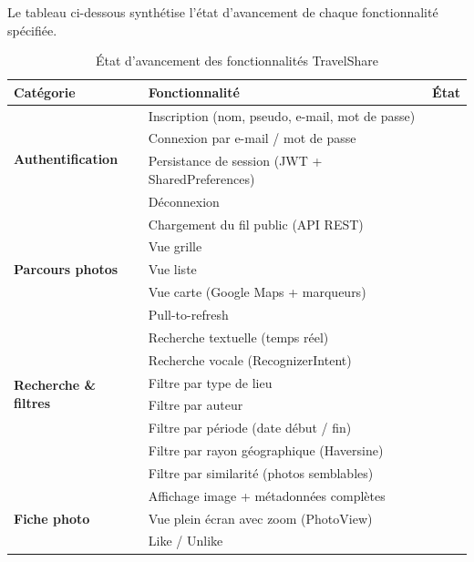 \documentclass[12pt, a4paper, openany]{report}
\newcommand{\cmark}{\textcolor{success}{\ding{51}}}
\newcommand{\pmark}{\textcolor{warning}{\ding{119}}}
\begin{document}
Le tableau ci-dessous synthétise l'état d'avancement de chaque fonctionnalité spécifiée.

\begin{table}[H]
\centering
\caption{État d'avancement des fonctionnalités TravelShare}
\renewcommand{\arraystretch}{1.4}
\begin{tabularx}{\textwidth}{lXc}
\toprule
\rowcolor{primary!20}
\textbf{Catégorie} & \textbf{Fonctionnalité} & \textbf{État} \\
\midrule
\multirow{4}{*}{\textbf{Authentification}}
  & Inscription (nom, pseudo, e-mail, mot de passe) & \cmark \\
  & Connexion par e-mail / mot de passe              & \cmark \\
  & Persistance de session (JWT + SharedPreferences) & \cmark \\
  & Déconnexion                                      & \cmark \\
\midrule
\multirow{5}{*}{\textbf{Parcours photos}}
  & Chargement du fil public (API REST)              & \cmark \\
  & Vue grille                                       & \cmark \\
  & Vue liste                                        & \cmark \\
  & Vue carte (Google Maps + marqueurs)              & \cmark \\
  & Pull-to-refresh                                  & \cmark \\
\midrule
\multirow{6}{*}{\textbf{Recherche \& filtres}}
  & Recherche textuelle (temps réel)                 & \cmark \\
  & Recherche vocale (RecognizerIntent)              & \cmark \\
  & Filtre par type de lieu                          & \cmark \\
  & Filtre par auteur                                & \cmark \\
  & Filtre par période (date début / fin)            & \cmark \\
  & Filtre par rayon géographique (Haversine)        & \cmark \\
  & Filtre par similarité (photos semblables)        & \pmark \\
\midrule
\multirow{6}{*}{\textbf{Fiche photo}}
  & Affichage image + métadonnées complètes          & \cmark \\
  & Vue plein écran avec zoom (PhotoView)            & \cmark \\
  & Like / Unlike                                    & \cmark \\

\end{tabularx}
\end{table}
\end{document}
